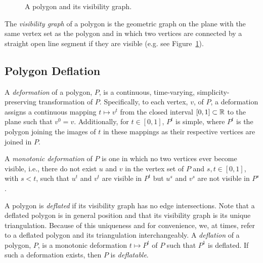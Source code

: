 \documentclass[11pt]{amsart}
\begin{document}
\begin{figure}[htb]
  \centering
  \quad
  \caption{\protect{} A polygon
    and \protect{} its visibility graph.}
  \label{fig:vv-vis-graph}
\end{figure}

The \emph{visibility graph} of a polygon is the geometric graph on the
plane with the same vertex set as the polygon and in which two
vertices are connected by a straight open line segment if they are
visible (e.g. see Figure~\ref{fig:vv-vis-graph}).


\subsection{Polygon Deflation}

A \emph{deformation} of a polygon, $P$, is a continuous, time-varying,
simplicity-preserving transformation of $P$.  Specifically, to each
vertex, $v$, of $P$, a deformation assigns a continuous mapping
$t\mapsto v^t$ from the closed interval $[0,1]\subset\mathbb{R}$ to the plane
such that $v^0 = v$.  Additionally, for $t\in[0,1]$, $P^t$ is simple,
where $P^t$ is the polygon joining the images of $t$ in these mappings
as their respective vertices are joined in $P$.

A \emph{monotonic deformation} of $P$ is one in which no two vertices
ever become visible, i.e., there do not exist $u$ and $v$ in the
vertex set of $P$ and $s, t\in [0, 1]$, with $s < t$, such that $u^t$
and $v^t$ are visible in $P^t$ but $u^s$ and $v^s$ are not visible in
$P^s$.


A polygon is \emph{deflated} if its visibility graph has no edge
intersections.  Note that a deflated polygon is in general position
and that its visibility graph is its unique triangulation.  Because of
this uniqueness and for convenience, we, at times, refer to a deflated
polygon and its triangulation interchangeably.  A \emph{deflation} of
a polygon, $P$, is a monotonic deformation $t\mapsto P^t$ of $P$ such
that $P^1$ is deflated.  If such a deformation exists, then $P$ is
\emph{deflatable}.
\end{document}
